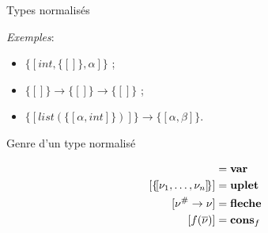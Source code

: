 \documentclass[serif]{beamer}
\newcommand{\exemples}{\textit{Exemples}\xspace}
\newcommand{\mset}[1]{\{\![#1]\!\}}
\newcommand{\V}{\mathscr{V}}
\newcommand{\F}{\mathscr{F}}
\newcommand{\G}{\mathscr{G}}
\newcommand{\N}{\mathrm{N}}
\begin{document}

\begin{frame}{Types normalisés}
\exemples :
\begin{itemize}
	\item $\mset{int, \mset{}, \alpha}$ ;
	\item $\mset{} \rightarrow \mset{} \rightarrow \mset{}$ ;
	\item $\mset{list (\mset{\alpha, int})} \rightarrow \mset{\alpha, \beta}$.
\end{itemize}
\end{frame}


\begin{frame}{Genre d'un type normalisé}
\small
{}
\begin{align*}
		[ \alpha ] &= \bold{var}
	\\
		[ \mset{\nu_1, \dots, \nu_n} ] &= \bold{uplet}
	\\
		[ \nu^\# \rightarrow \nu ] &= \bold{fleche}
	\\
		[ f (\overline \nu) ] &= \bold{cons}_f
\end{align*}
\end{frame}

\end{document}
